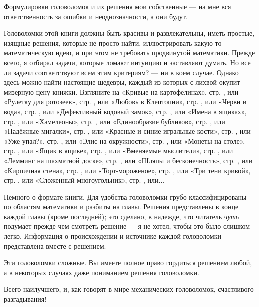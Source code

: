 Формулировки головоломок и их решения мои собственные --- на мне вся ответственность за ошибки и неоднозначности,
а они будут.

Головоломки этой книги должны быть красивы и развлекательны,
иметь простые, изящные решения, которые не просто найти,
иллюстрировать какую-то математическую идею,
и при этом не требовать продвинутой математики.
Прежде всего, я отбирал задачи, которые ломают интуицию и заставляют думать.
Но все ли задачи соответствуют всем этим критериям? --- ни в коем случае.
Однако здесь можно найти настоящие шедевры, каждый из которых с лихвой окупит мизерную цену книжки.
Взгляните на
«Кривые на картофелинах», стр. \pageref{Кривые на картофелинах}, или
«Рулетку для ротозеев», стр. \pageref{Рулетка для ротозеев}, или
«Любовь в Клептопии», стр. \pageref{Любовь в Клептопии}, или
«Черви и вода», стр. \pageref{Черви и вода}, или
«Дефективный кодовый замок», стр. \pageref{Дефективный кодовый замок}, или
«Имена в ящиках», стр. \pageref{Имена в ящиках}, или
«Хамелеоны», стр. \pageref{Хамелеоны}, или
«Единообразие бубликов», стр. \pageref{Единообразие бубликов}, или
«Надёжные мигалки», стр. \pageref{Надёжные мигалки}, или
«Красные и синие игральные кости», стр. \pageref{Красные и синие игральные кости}, или
«Уже упал?», стр. \pageref{Уже упал?}, или
«Элис на окружности», стр. \pageref{Элис на окружности}, или
«Монеты на столе», стр. \pageref{Монеты на столе}, или
«Ящик в ящике», стр. \pageref{Ящик в ящике}, или
«Вменяемые мыслители», стр. \pageref{Вменяемые мыслители}, или
«Лемминг на шахматной доске», стр. \pageref{Лемминг на шахматной доске}, или
«Шляпы и бесконечность», стр. \pageref{Шляпы и бесконечность}, или
«Кирпичная стена», стр. \pageref{Кирпичная стена}, или
«Торт-мороженое», стр. \pageref{Торт-мороженое}, или
«Три тени кривой», стр. \pageref{Три тени кривой}, или
«Сложенный многоугольник», стр. \pageref{Сложенный многоугольник}, или...

Немного о формате книги.
Для удобства головоломки грубо классифицированы по областям математики и
разбиты на главы.
Решения представлены в конце каждой главы (кроме последней);
это сделано, в надежде, что читатель \emph{чуть} подумает прежде чем смотреть решение --- я не хотел, чтобы это было слишком легко.
Информация о происхождении и источнике каждой головоломки представлена вместе с решением.

Эти головоломки сложные.
Вы имеете полное право гордиться решением любой, а в некоторых случаях даже пониманием решения головоломки.

Всего наилучшего, и, как говорят в мире механических головоломок, счастливого разгадывания!

